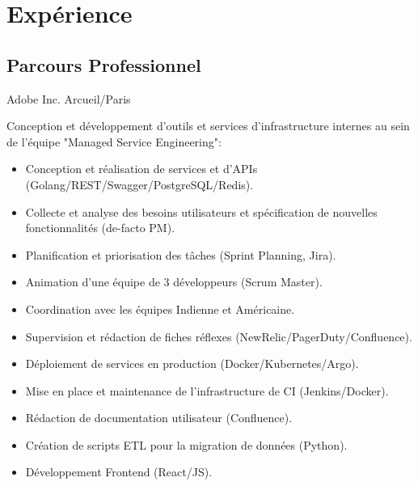 \documentclass[10pt,a4paper,sans]{moderncv}        %
\begin{document}
\maketitle


\section{Expérience}
\subsection{Parcours Professionnel}

        {Adobe Inc.}
        {Arcueil/Paris}
        {}
        {}

        {}
        {}
        {}
        {Conception et développement d'outils et services d'infrastructure internes au sein de l'équipe "Managed Service Engineering":
            \begin{itemize}
            \item Conception et réalisation de services et d'APIs (Golang/REST/Swagger/PostgreSQL/Redis).
            \item Collecte et analyse des besoins utilisateurs et spécification de nouvelles fonctionnalités (de-facto PM).
            \item Planification et priorisation des tâches (Sprint Planning, Jira).
            \item Animation d'une équipe de 3 développeurs (Scrum Master).
            \item Coordination avec les équipes Indienne et Américaine.
            \item Supervision et rédaction de fiches réflexes (NewRelic/PagerDuty/Confluence).
            \item Déploiement de services en production (Docker/Kubernetes/Argo).
            \item Mise en place et maintenance de l'infrastructure de CI (Jenkins/Docker).
            \item Rédaction de documentation utilisateur (Confluence).
            \item Création de scripts ETL pour la migration de données (Python).
            \item Développement Frontend (React/JS).
            \end{itemize}
        }
\end{document}
